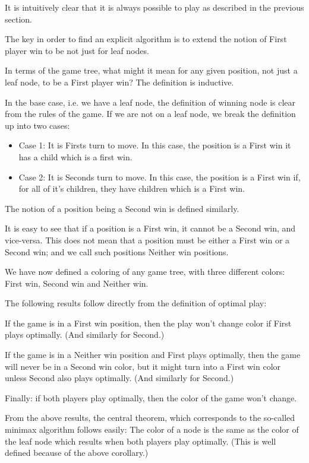 It is intuitively clear that it is always possible to play as described in the previous section.

The key in order to find an explicit algorithm is to extend the notion of First player win to be not just for leaf nodes.

In terms of the game tree, what might it mean for any given position, not just a leaf node, to be a First player win?
The definition is inductive.

In the base case, i.e. we have a leaf node, the definition of winning node is clear from the rules of the game.
If we are not on a leaf node, we break the definition up into two cases:

\begin{itemize}
  \item Case 1: It is Firsts turn to move.
    In this case, the position is a First win it has a child which is a first win.
  \item Case 2: It is Seconds turn to move.
    In this case, the position is a First win if, for all of it's children, they have children which is a First win.
\end{itemize}

The notion of a position being a Second win is defined similarly.

It is easy to see that if a position is a First win, it cannot be a Second win, and vice-versa.
This does not mean that a position must be either a First win or a Second win; and we call such positions Neither win positions.

We have now defined a coloring of any game tree, with three different colors: First win, Second win and Neither win.

The following results follow directly from the definition of optimal play:

If the game is in a First win position, then the play won't change color if First plays optimally.
(And similarly for Second.)

If the game is in a Neither win position and First plays optimally, then the game will never be in a Second win color, but it might turn into a First win color unless Second also plays optimally.
(And similarly for Second.)

Finally: if both players play optimally, then the color of the game won't change.

From the above results, the central theorem, which corresponds to the so-called minimax algorithm follows easily:
The color of a node is the same as the color of the leaf node which results when both players play optimally.
(This is well defined because of the above corollary.)

